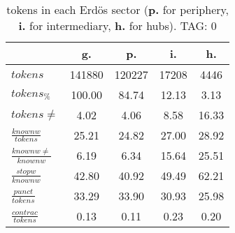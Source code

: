 \begin{table}[h!]
\begin{center}
\begin{tabular}{| l || c | c | c | c |}\hline
 & {\bf g.} & {\bf p.} & {\bf i.} & {\bf h.} \\\hline\hline
$tokens$ & 141880  & 120227  & 17208  & 4446 \\
$tokens_{\%}$ & 100.00  & 84.74  & 12.13  & 3.13 \\
$tokens \neq$ & 4.02  & 4.06  & 8.58  & 16.33 \\\hline
$\frac{knownw}{tokens}$ & 25.21  & 24.82  & 27.00  & 28.92 \\
$\frac{knownw \neq}{knownw}$ & 6.19  & 6.34  & 15.64  & 25.51 \\\hline
$\frac{stopw}{knownw}$ & 42.80  & 40.92  & 49.49  & 62.21 \\
$\frac{punct}{tokens}$ & 33.29  & 33.90  & 30.93  & 25.98 \\
$\frac{contrac}{tokens}$ & 0.13  & 0.11  & 0.23  & 0.20 \\\hline
\end{tabular}
\caption{tokens in each Erd\"os sector ({{\bf p.}} for periphery, {{\bf i.}} for intermediary, 
    {{\bf h.}} for hubs). TAG: 0}
\end{center}
\end{table}